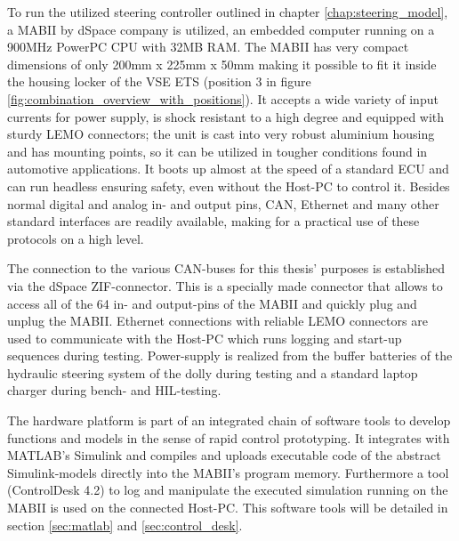 \documentclass[ExampleMasters.tex]{subfiles}
\begin{document}
To run the utilized steering controller outlined in chapter \ref{chap:steering_model}, a \gls{MABII} by dSpace company is utilized, an embedded computer running on a 900MHz PowerPC CPU with 32MB RAM. The \gls{MABII} has very compact dimensions of only 200mm x 225mm x 50mm making it possible to fit it inside the housing locker of the \gls{VSE} \gls{ETS} (position 3 in figure \ref{fig:combination_overview_with_positions}). It accepts a wide variety of input currents for power supply, is shock resistant to a high degree and equipped with sturdy \acrshort{LEMO}  connectors; the unit is cast into very robust aluminium housing and has mounting points, so it can be utilized in tougher conditions found in automotive applications. It boots up almost at the speed of a standard \gls{ECU} and can run headless ensuring safety, even without the Host-PC to control it. Besides normal digital and analog in- and output pins, CAN, Ethernet and many other standard interfaces are readily available, making for a practical use of these protocols on a high level. 

The connection to the various \gls{CAN}-buses for this thesis' purposes is established via the dSpace \gls{ZIF}-connector. This is a specially made connector that allows to access all of the 64 in- and output-pins of the \gls{MABII} and quickly plug and unplug the \gls{MABII}. Ethernet connections with reliable \acrshort{LEMO} connectors are used to communicate with the Host-PC which runs logging and start-up sequences during testing. Power-supply is realized from the buffer batteries of the hydraulic steering system of the dolly during testing and a standard laptop charger during bench- and \gls{HIL}-testing.

The hardware platform is part of an integrated chain of software tools to develop functions and models in the sense of rapid control prototyping. It integrates with MATLAB's Simulink and compiles and uploads executable code of the abstract Simulink-models directly into the MABII's program memory. Furthermore a tool (ControlDesk 4.2) to log and manipulate the executed simulation running on the \gls{MABII} is used on the connected Host-PC. This software tools will be detailed in section \ref{sec:matlab} and \ref{sec:control_desk}\cite{MABII_product_descr}.
\end{document}
